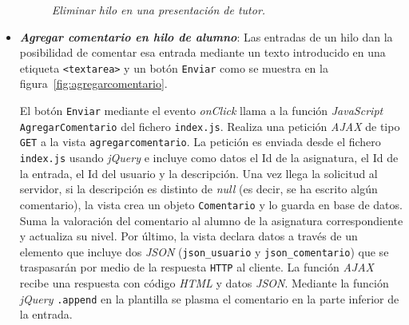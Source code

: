 \documentclass[a4paper, 12pt]{book}
\begin{document}
\begin{itemize}
  \begin{figure}
    \centering
    \caption{\textit{Eliminar hilo en una presentaci\'on de tutor.}}
    \label{fig:eliminarhilotutor}
  \end{figure}
  
  \item {\bfseries \textit{Agregar comentario en hilo de alumno}}: Las entradas de un hilo dan la posibilidad de comentar esa entrada mediante un texto
  introducido en una etiqueta \texttt{<textarea>} y un bot\'on \texttt{Enviar} como se muestra en la figura~\ref{fig:agregarcomentario}.
  
  El bot\'on \texttt{Enviar} mediante el evento \textit{onClick} llama a la funci\'on \textit{JavaScript}\\ \texttt{AgregarComentario} del fichero 
  \texttt{index.js}. Realiza una petici\'on \textit{AJAX} de tipo \texttt{GET} a la vista \texttt{agregarcomentario}. La petici\'on es enviada desde el 
  fichero \texttt{index.js} usando \textit{jQuery} e incluye como datos el Id de la asignatura, el Id de la entrada, el Id del usuario y la descripci\'on.
  Una vez llega la solicitud al servidor, si la descripci\'on es distinto de \textit{null} (es decir, se ha escrito alg\'un comentario), la vista crea un
  objeto \texttt{Comentario} y lo guarda en base de datos. Suma la valoraci\'on del comentario al alumno de la asignatura correspondiente y actualiza su 
  nivel. Por \'ultimo, la vista declara datos a trav\'es de un elemento que incluye dos \textit{JSON} (\texttt{json\_usuario} y \texttt{json\_comentario})
  que se traspasar\'an por medio de la respuesta \texttt{HTTP} al cliente. La funci\'on \textit{AJAX} recibe una respuesta con c\'odigo \textit{HTML} y datos \textit{JSON}. 
  Mediante la funci\'on \textit{jQuery} \texttt{.append} en la plantilla se plasma el comentario en la parte inferior de la entrada.
  

\end{itemize}
\end{document}
